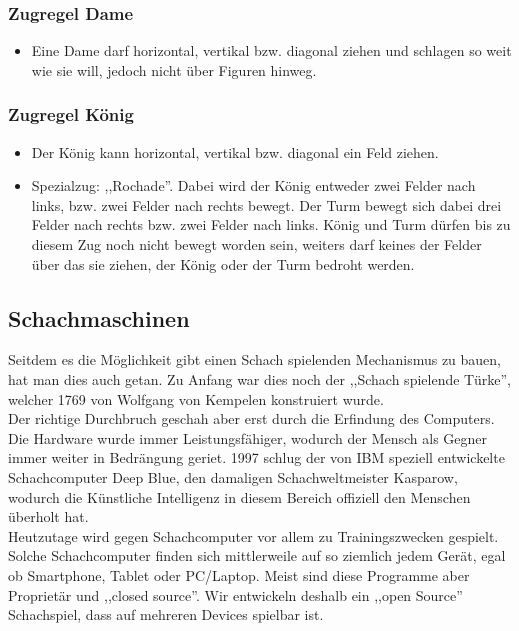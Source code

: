 \documentclass[12pt,a4paper]{article}
\begin{document}
{\subsubsection{Zugregel Dame}
\label{SUBSUBSEC:QUEEN}
\begin{itemize}
	\item{Eine Dame darf horizontal, vertikal bzw. diagonal ziehen und schlagen so weit wie sie will, jedoch nicht über Figuren hinweg.}
\end{itemize}

\subsubsection{Zugregel König}
\label{SUBSUBSEC:KING}
\begin{itemize}
	\item{Der König kann horizontal, vertikal bzw. diagonal ein Feld ziehen.}
	\item{Spezialzug: ,,Rochade''. Dabei wird der König entweder zwei Felder nach links, bzw. zwei Felder nach rechts bewegt. Der Turm bewegt sich dabei drei Felder nach rechts bzw. zwei Felder nach links. König und Turm dürfen bis zu diesem Zug noch nicht bewegt worden sein, weiters darf keines der Felder über das sie ziehen, der König oder der Turm bedroht werden.}
\end{itemize}



\subsection{Schachmaschinen}
\label{SUBSUBSEC:CHESS-COMPUTERS}

Seitdem es die Möglichkeit gibt einen Schach spielenden Mechanismus zu bauen, hat man dies auch getan. Zu Anfang war dies noch der ,,Schach spielende Türke'', welcher 1769 von Wolfgang von Kempelen konstruiert wurde. \\ 
Der richtige Durchbruch geschah aber erst durch die Erfindung des Computers. Die Hardware wurde immer Leistungsfähiger, wodurch der Mensch als Gegner immer weiter in Bedrängung geriet. 1997 schlug der von IBM speziell entwickelte Schachcomputer Deep Blue, den damaligen Schachweltmeister Kasparow, wodurch die Künstliche Intelligenz in diesem Bereich offiziell den Menschen überholt hat. \\
Heutzutage wird gegen Schachcomputer vor allem zu Trainingszwecken gespielt. Solche Schachcomputer finden sich mittlerweile auf so ziemlich jedem Gerät, egal ob Smartphone, Tablet oder PC/Laptop. Meist sind diese Programme aber Proprietär und ,,closed source''. Wir entwickeln deshalb ein ,,open Source'' Schachspiel, dass auf mehreren Devices spielbar ist.
 



}
\end{document}
